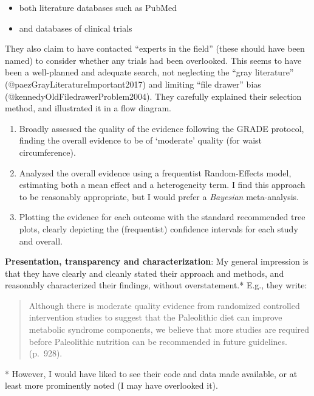 \documentclass[]{article}
\providecommand{\tightlist}{%
  \setlength{\itemsep}{0pt}\setlength{\parskip}{0pt}}
\begin{document}
\begin{itemize}
\tightlist
\item
  both literature databases such as PubMed
\item
  and databases of clinical trials
\end{itemize}

They also claim to have contacted ``experts in the field'' (these should
have been named) to consider whether any trials had been overlooked.
This seems to have been a well-planned and adequate search, not
neglecting the ``gray literature'' (@paezGrayLiteratureImportant2017)
and limiting ``file drawer'' bias (@kennedyOldFiledrawerProblem2004).
They carefully explained their selection method, and illustrated it in a
flow diagram.

\begin{enumerate}
\def\labelenumi{\arabic{enumi}.}
\setcounter{enumi}{2}
\item
  Broadly assessed the quality of the evidence following the GRADE
  protocol, finding the overall evidence to be of `moderate' quality
  (for waist circumference).
\item
  Analyzed the overall evidence using a frequentist Random-Effects
  model, estimating both a mean effect and a heterogeneity term. I find
  this approach to be reasonably appropriate, but I would prefer a
  \emph{Bayesian} meta-analysis.
\item
  Plotting the evidence for each outcome with the standard recommended
  tree plots, clearly depicting the (frequentist) confidence intervals
  for each study and overall.
\end{enumerate}

\textbf{Presentation, transparency and characterization}: My general
impression is that they have clearly and cleanly stated their approach
and methods, and reasonably characterized their findings, without
overstatement.* E.g., they write:

\begin{quote}
Although there is moderate quality evidence from randomized controlled
intervention studies to suggest that the Paleolithic diet can improve
metabolic syndrome components, we believe that more studies are required
before Paleolithic nutrition can be recommended in future guidelines.
(p.~928).
\end{quote}

* However, I would have liked to see their code and data made available,
or at least more prominently noted (I may have overlooked it).
\end{document}
